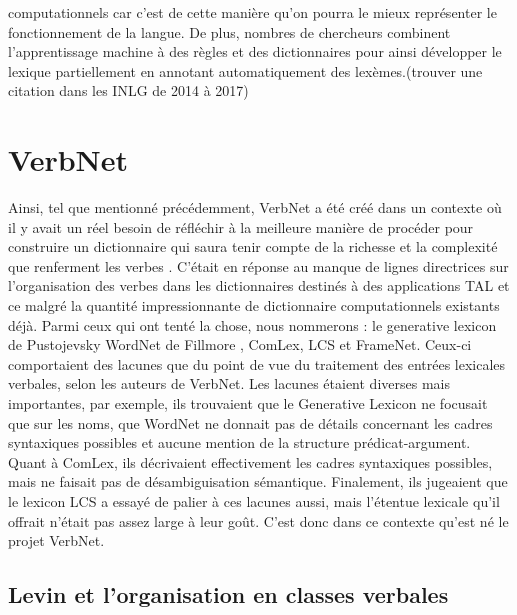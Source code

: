 computationnels car c'est de cette manière qu'on pourra le mieux représenter le fonctionnement de la langue. De plus, nombres de chercheurs combinent l'apprentissage machine à des règles et des dictionnaires pour ainsi développer le lexique partiellement en annotant automatiquement des lexèmes.(trouver une citation dans les INLG de 2014 à 2017)

\section{VerbNet}

Ainsi, tel que mentionné précédemment, VerbNet a été créé dans un contexte où il y avait un réel besoin de réfléchir à la meilleure manière de procéder pour construire un dictionnaire qui saura tenir compte de la richesse et la complexité que renferment les verbes \citep{KipperClassBasedConstructionVerb2000}. C'était en réponse au manque de lignes directrices sur l'organisation des verbes dans les dictionnaires destinés à des applications TAL et ce malgré la quantité impressionnante de dictionnaire computationnels existants déjà. Parmi ceux qui ont tenté la chose, nous nommerons : le generative lexicon de Pustojevsky \citep{PustejovskyGenerativeLexicon1991} WordNet de Fillmore \citep{MillerWordNetLexicalDatabase1995}, ComLex\citep{Grishman:1994:CSB:991886.991931}, LCS\citep{13776} et FrameNet\citep{BakerBerkeleyFrameNetProject1998}. Ceux-ci comportaient des lacunes que du point de vue du traitement des entrées lexicales verbales, selon les auteurs de VerbNet. Les lacunes étaient diverses mais importantes, par exemple, ils trouvaient que le Generative Lexicon ne focusait que sur les noms, que WordNet ne donnait pas de détails concernant les cadres syntaxiques possibles  et aucune mention de la structure prédicat-argument. Quant à ComLex, ils décrivaient effectivement les cadres syntaxiques possibles, mais ne faisait pas de désambiguisation sémantique. Finalement, ils jugeaient que le lexicon LCS a essayé de palier à ces lacunes aussi, mais l'étentue lexicale qu'il offrait n'était pas assez large à leur goût\citep{SchulerVerbnetBroadcoverageComprehensive2005}. C'est donc dans ce contexte qu'est né le projet VerbNet.

\subsection{Levin et l'organisation en classes verbales}

